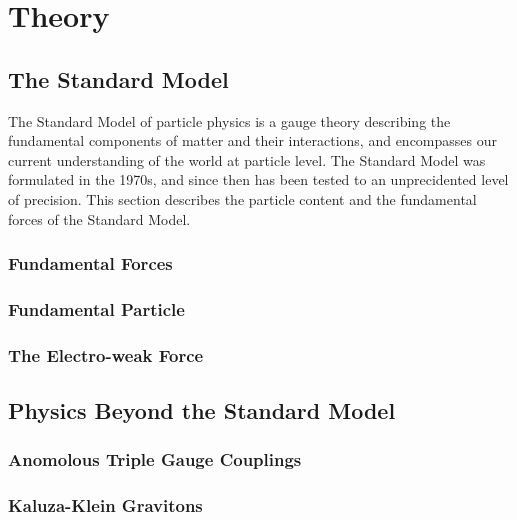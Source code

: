 \graphicspath{{Chapters/Theory/Figures/}}
\chapter{Theory}
\label{chap:Theory}

\section{The Standard Model}

The Standard Model of particle physics is a gauge theory describing the
fundamental components of matter and their interactions, and encompasses our
current understanding of the world at particle level. The Standard Model was
formulated in the 1970s, and since then has been tested to an unprecidented
level of precision. %
This section describes the particle content and the fundamental forces of the Standard Model.

\subsection{Fundamental Forces}

\subsection{Fundamental Particle}

\subsection{The Electro-weak Force}

\section{Physics Beyond the Standard Model}

\subsection{Anomolous Triple Gauge Couplings}

\subsection{Kaluza-Klein Gravitons}
